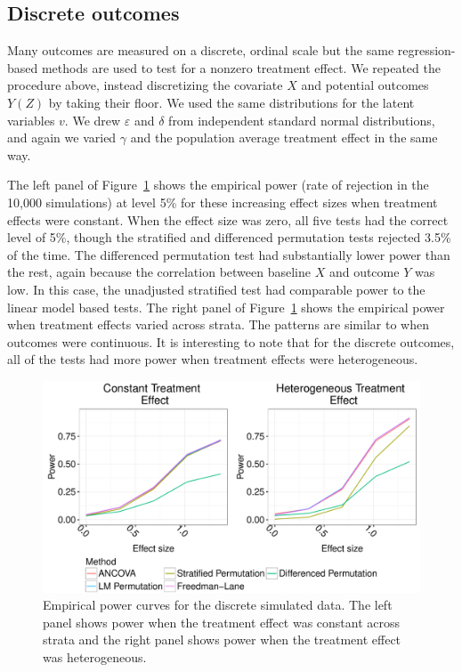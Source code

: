 \documentclass[12pt]{article}
\begin{document}
\subsection{Discrete outcomes}

Many outcomes are measured on a discrete, ordinal scale but the same regression-based methods are used to test for a nonzero treatment effect.
We repeated the procedure above, instead discretizing the covariate $X$ and potential outcomes $Y(Z)$ by taking their floor.
We used the same distributions for the latent variables $v$.
We drew $\varepsilon$ and $\delta$ from independent standard normal distributions, and again we varied $\gamma$ and the population average treatment effect in the same way.

The left panel of Figure~\ref{fig:discrete_outcomes_sim_power} shows the empirical power (rate of rejection in the 10,000 simulations) at level 5\% for these increasing effect sizes when treatment effects were constant.
When the effect size was zero, all five tests had the correct level of 5\%, though the stratified and differenced permutation tests rejected 3.5\% of the time.
The differenced permutation test had substantially lower power than the rest,
again because the correlation between baseline $X$ and outcome $Y$ was low.
In this case, the unadjusted stratified test had comparable power to the linear model based tests.
The right panel of Figure~\ref{fig:discrete_outcomes_sim_power} shows the empirical power when treatment effects varied across strata.
The patterns are similar to when outcomes were continuous.
It is interesting to note that for the discrete outcomes, all of the tests had more power when treatment effects were heterogeneous.
\begin{figure}[h]
\centering
\includegraphics[width = \textwidth]{fig/discrete_outcomes_simulation_power.pdf}
\caption{Empirical power curves for the discrete simulated data. The left panel shows power when the treatment effect was constant across strata and the right panel shows power when the treatment effect was heterogeneous.}
\label{fig:discrete_outcomes_sim_power}
\end{figure}
\end{document}
